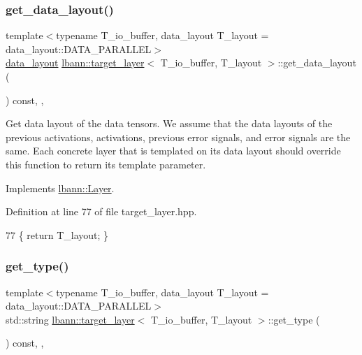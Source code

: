 \subsubsection{\texorpdfstring{get\+\_\+data\+\_\+layout()}{get\_data\_layout()}}
{\footnotesize\ttfamily template$<$typename T\+\_\+io\+\_\+buffer, data\+\_\+layout T\+\_\+layout = data\+\_\+layout\+::\+D\+A\+T\+A\+\_\+\+P\+A\+R\+A\+L\+L\+EL$>$ \\
\hyperlink{base_8hpp_a786677cbfb3f5677b4d84f3056eb08db}{data\+\_\+layout} \hyperlink{classlbann_1_1target__layer}{lbann\+::target\+\_\+layer}$<$ T\+\_\+io\+\_\+buffer, T\+\_\+layout $>$\+::get\+\_\+data\+\_\+layout (\begin{DoxyParamCaption}{ }\end{DoxyParamCaption}) const\hspace{0.3cm}{\ttfamily [inline]}, {\ttfamily [override]}, {\ttfamily [virtual]}}

Get data layout of the data tensors. We assume that the data layouts of the previous activations, activations, previous error signals, and error signals are the same. Each concrete layer that is templated on its data layout should override this function to return its template parameter. 

Implements \hyperlink{classlbann_1_1Layer_a5dfb66e81fc085997402a5e2241316bd}{lbann\+::\+Layer}.



Definition at line 77 of file target\+\_\+layer.\+hpp.


\begin{DoxyCode}
77 \{ \textcolor{keywordflow}{return} T\_layout; \}
\end{DoxyCode}
\mbox{\label{classlbann_1_1target__layer_a6b5dad32cf3b771d6db1f99914ab63c4}} 
\subsubsection{\texorpdfstring{get\+\_\+type()}{get\_type()}}
{\footnotesize\ttfamily template$<$typename T\+\_\+io\+\_\+buffer, data\+\_\+layout T\+\_\+layout = data\+\_\+layout\+::\+D\+A\+T\+A\+\_\+\+P\+A\+R\+A\+L\+L\+EL$>$ \\
std\+::string \hyperlink{classlbann_1_1target__layer}{lbann\+::target\+\_\+layer}$<$ T\+\_\+io\+\_\+buffer, T\+\_\+layout $>$\+::get\+\_\+type (\begin{DoxyParamCaption}{ }\end{DoxyParamCaption}) const\hspace{0.3cm}{\ttfamily [inline]}, {\ttfamily [override]}, {\ttfamily [virtual]}}

